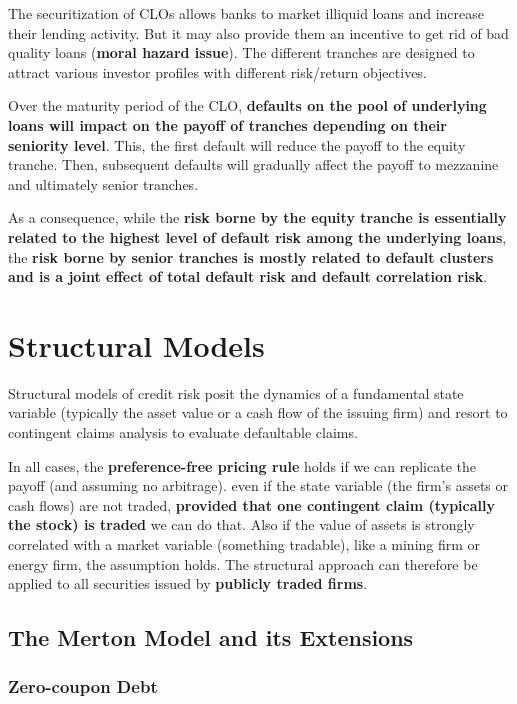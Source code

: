 \documentclass[12pt,a4paper]{article}
\begin{document}
The securitization of CLOs allows banks to market illiquid loans and increase their lending activity. But it may also provide them an incentive to get rid of bad quality loans (\textbf{moral hazard issue}). The different tranches are designed to attract various investor profiles with different risk/return objectives.

Over the maturity period of the CLO, \textbf{defaults on the pool of underlying loans will impact on the payoff of tranches depending on their seniority level}. This, the first default will reduce the payoff to the equity tranche. Then, subsequent defaults will gradually affect the payoff to mezzanine and ultimately senior tranches.

As a consequence, while the \textbf{risk borne by the equity tranche is essentially related to the highest level of default risk among the underlying loans}, the \textbf{risk borne by senior tranches is mostly related to default clusters and is a joint effect of total default risk and default correlation risk}.




\section{Structural Models}
Structural models of credit risk posit the dynamics of a fundamental state variable (typically the 
asset value or a cash flow of the issuing firm) and resort to contingent claims analysis to evaluate 
defaultable claims.
 

In all cases, the \textbf{preference-free pricing rule} holds if we can replicate the payoff (and assuming no arbitrage). even if the state variable (the firm's assets or cash flows) are not traded, \textbf{provided that one contingent claim (typically the stock) is traded } we can do that. Also if the value of assets is strongly correlated with a market variable (something tradable), like a mining firm or energy firm, the assumption holds. The structural approach can therefore be applied to all securities issued by \textbf{publicly traded firms}.

\subsection{The Merton Model and its Extensions}

\subsubsection{Zero-coupon Debt}
\end{document}

